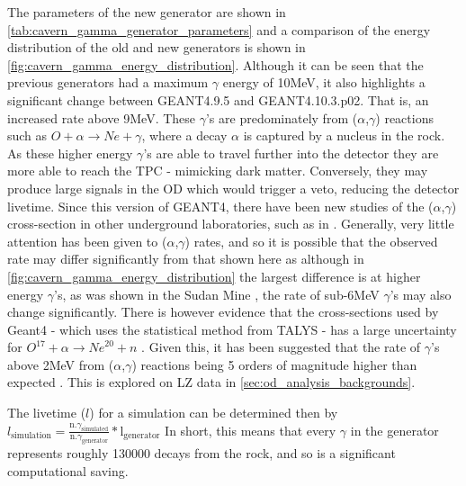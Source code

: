 \par
The parameters of the new generator are shown in \autoref{tab:cavern_gamma_generator_parameters} and a comparison of the energy distribution of the old and new generators is shown in \autoref{fig:cavern_gamma_energy_distribution}.
Although it can be seen that the previous generators had a maximum $\gamma$ energy of 10MeV, it also highlights a significant change between GEANT4.9.5 and GEANT4.10.3.p02.
That is, an increased rate above 9MeV.
These $\gamma$'s are predominately from ($\alpha$,$\gamma$) reactions such as $O + \alpha \to Ne + \gamma$, where a decay $\alpha$ is captured by a nucleus in the rock.
As these higher energy $\gamma$'s are able to travel further into the detector they are more able to reach the TPC - mimicking dark matter.
Conversely, they may produce large signals in the OD which would trigger a veto, reducing the detector livetime.
Since this version of GEANT4, there have been new studies of the ($\alpha$,$\gamma$) cross-section in other underground laboratories, such as in \cite{cavern_gammas_in_Soudan_mine_ref}.
Generally, very little attention has been given to ($\alpha$,$\gamma$) rates, and so it is possible that the observed rate may differ significantly from that shown here as although in \autoref{fig:cavern_gamma_energy_distribution} the largest difference is at higher energy $\gamma$'s, as was shown in the Sudan Mine \cite{cavern_gammas_in_Soudan_mine_ref}, the rate of sub-6MeV $\gamma$'s may also change significantly. 
There is however evidence that the cross-sections used by Geant4 - which uses the statistical method from TALYS \cite{talys_ref} - has a large uncertainty for ${O}^{17} + \alpha \to {Ne}^{20} + n$ \cite{alpha_gamma_statistical_error_ref}.
Given this, it has been suggested that the rate of $\gamma$'s above 2MeV from ($\alpha$,$\gamma$) reactions being 5 orders of magnitude higher than expected \cite{soudanmine_counter_point_ref, alpha_gamma_reactions_ref}.
This is explored on LZ data in \autoref{sec:od_analysis_backgrounds}.

\par
The livetime ($l$) for a simulation can be determined then by $l_{\text{simulation}} = \frac{\text{n.} \gamma_{\text{simulated}}}{\text{n.} \gamma_{\text{generator}}} * \text{l}_{\text{generator}}$
In short, this means that every $\gamma$ in the generator represents roughly 130000 decays from the rock, and so is a significant computational saving.


